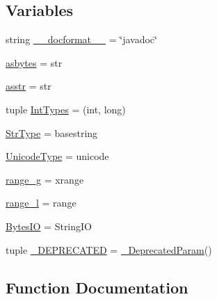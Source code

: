 \subsection*{Variables}
\begin{DoxyCompactItemize}
\item 
string \hyperlink{namespacesoftware_1_1chipwhisperer_1_1capture_1_1utils_1_1IntelHex_acba229989dcc9f5d648d05b8add53026}{\+\_\+\+\_\+docformat\+\_\+\+\_\+} = \char`\"{}javadoc\char`\"{}
\item 
\hyperlink{namespacesoftware_1_1chipwhisperer_1_1capture_1_1utils_1_1IntelHex_a7f086f0677c4876409244a91e386b8cc}{asbytes} = str
\item 
\hyperlink{namespacesoftware_1_1chipwhisperer_1_1capture_1_1utils_1_1IntelHex_a32eb6deeafe6dba1f76d94543cff7528}{asstr} = str
\item 
tuple \hyperlink{namespacesoftware_1_1chipwhisperer_1_1capture_1_1utils_1_1IntelHex_a34682ee317fa430599b7c44473a9f2c8}{Int\+Types} = (int, long)
\item 
\hyperlink{namespacesoftware_1_1chipwhisperer_1_1capture_1_1utils_1_1IntelHex_a22f9264f3c679aecae475257dd6ba7ab}{Str\+Type} = basestring
\item 
\hyperlink{namespacesoftware_1_1chipwhisperer_1_1capture_1_1utils_1_1IntelHex_a2c7618fbc00082e7f206aac9ae321cbd}{Unicode\+Type} = unicode
\item 
\hyperlink{namespacesoftware_1_1chipwhisperer_1_1capture_1_1utils_1_1IntelHex_abac275d54b0c0dc47a6ef2f7c4f7bcdf}{range\+\_\+g} = xrange
\item 
\hyperlink{namespacesoftware_1_1chipwhisperer_1_1capture_1_1utils_1_1IntelHex_ae461be5d25f46823cb710380e27eb1a1}{range\+\_\+l} = range
\item 
\hyperlink{namespacesoftware_1_1chipwhisperer_1_1capture_1_1utils_1_1IntelHex_a9a096078c0304b8899258794dfdd8d29}{Bytes\+I\+O} = String\+I\+O
\item 
tuple \hyperlink{namespacesoftware_1_1chipwhisperer_1_1capture_1_1utils_1_1IntelHex_a8131851f2e831190e56a70e7651d2189}{\+\_\+\+D\+E\+P\+R\+E\+C\+A\+T\+E\+D} = \hyperlink{classsoftware_1_1chipwhisperer_1_1capture_1_1utils_1_1IntelHex_1_1__DeprecatedParam}{\+\_\+\+Deprecated\+Param}()
\end{DoxyCompactItemize}


\subsection{Function Documentation}
\hypertarget{namespacesoftware_1_1chipwhisperer_1_1capture_1_1utils_1_1IntelHex_a9b0957d3d39ba63b4193f692c5c20be8}{}
